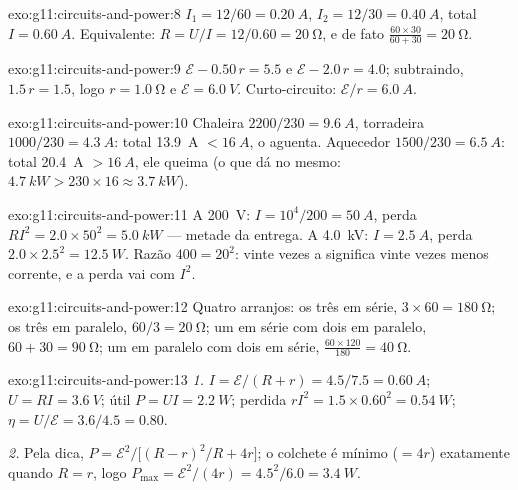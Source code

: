 \begin{solution}{exo:g11:circuits-and-power:8}
$I_1 = 12/60 = \qty{0.20}{A}$, $I_2 = 12/30 = \qty{0.40}{A}$, total
$I = \qty{0.60}{A}$. Equivalente: $R = U/I = 12/0.60 = \qty{20}{\ohm}$, e
de fato $\frac{60 \times 30}{60 + 30} = \qty{20}{\ohm}$.
\end{solution}

\begin{solution}{exo:g11:circuits-and-power:9}
$\mathcal{E} - 0.50\,r = 5.5$ e $\mathcal{E} - 2.0\,r = 4.0$;
subtraindo, $1.5\,r = 1.5$, logo $r = \qty{1.0}{\ohm}$ e
$\mathcal{E} = \qty{6.0}{V}$. Curto-circuito:
$\mathcal{E}/r = \qty{6.0}{A}$.
\end{solution}

\begin{solution}{exo:g11:circuits-and-power:10}
Chaleira $2200/230 = \qty{9.6}{A}$, torradeira
$1000/230 = \qty{4.3}{A}$: total \qty{13.9}{A} $< \qty{16}{A}$, o
 aguenta. Aquecedor $1500/230 = \qty{6.5}{A}$: total
\qty{20.4}{A} $> \qty{16}{A}$, ele queima (o que dá no mesmo:
$\qty{4.7}{kW} > 230 \times 16 \approx \qty{3.7}{kW}$).
\end{solution}

\begin{solution}{exo:g11:circuits-and-power:11}
A \qty{200}{V}: $I = 10^4/200 = \qty{50}{A}$, perda
$RI^2 = 2.0 \times 50^2 = \qty{5.0}{kW}$ --- metade da entrega. A
\qty{4.0}{kV}: $I = \qty{2.5}{A}$, perda
$2.0 \times 2.5^2 = \qty{12.5}{W}$. Razão $400 = 20^2$: vinte vezes a
 significa vinte vezes menos corrente, e a perda vai com $I^2$.
\end{solution}

\begin{solution}{exo:g11:circuits-and-power:12}
Quatro arranjos: os três em série, $3 \times 60 = \qty{180}{\ohm}$; os
três em paralelo, $60/3 = \qty{20}{\ohm}$; um em série com dois em
paralelo, $60 + 30 = \qty{90}{\ohm}$; um em paralelo com dois em série,
$\frac{60 \times 120}{180} = \qty{40}{\ohm}$.
\end{solution}

\begin{solution}{exo:g11:circuits-and-power:13}
\emph{1.} $I = \mathcal{E}/(R + r) = 4.5/7.5 = \qty{0.60}{A}$;
$U = RI = \qty{3.6}{V}$;  útil $P = UI = \qty{2.2}{W}$; perdida
$rI^2 = 1.5 \times 0.60^2 = \qty{0.54}{W}$;
$\eta = U/\mathcal{E} = 3.6/4.5 = 0.80$.

\emph{2.} Pela dica,
$P = \mathcal{E}^2 \big/ \big[(R - r)^2/R + 4r\big]$; o colchete é mínimo
($= 4r$) exatamente quando $R = r$, logo
$P_{\max} = \mathcal{E}^2/(4r) = 4.5^2/6.0 = \qty{3.4}{W}$.
\end{solution}

